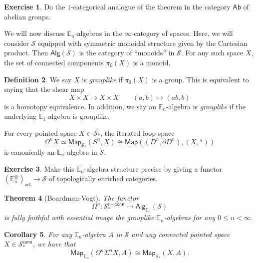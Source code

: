 \documentclass[10pt]{amsart}
\newtheorem{thm}{Theorem}[subsection]
\newtheorem{cor}[thm]{Corollary}
\theoremstyle{definition}
\newtheorem{defn}[thm]{Definition}
\newtheorem{exer}[thm]{Exercise}
\theoremstyle{remark}
\theoremstyle{plain}
\theoremstyle{definition}
\theoremstyle{remark}
\newcommand{\E}{\mathbb{E}}
\newcommand{\mc}[1]{\mathcal{#1}}
\newcommand{\ms}[1]{\mathsf{#1}}
\newcommand{\1}{\mathbf{1}}
\newcommand{\2}{\mathbf{2}}
\newcommand{\3}{\mathbf{3}}
\begin{document}
\begin{exer}
    Do the $1$-categorical analogue of the theorem in the category $\ms{Ab}$ of abelian groups.
\end{exer}

We will now discuss $\E_n$-algebras in the $\infty$-category of spaces. Here, we will consider $\mc{S}$ equipped with symmetric monoidal structure given by the Cartesian product. Then $\ms{Alg}(\mc{S})$ is the category of ``monoids'' in $\mc{S}$. For any such space $X$, the set of connected components $\pi_0(X)$ is a monoid.

\begin{defn}
    We say $X$ is \textit{grouplike} if $\pi_0 (X)$ is a group. This is equivalent to saying that the shear map
    \[ X \times X \to X \times X \qquad (a,b) \mapsto (ab, b) \]
    is a homotopy equivalence. In addition, we say an $\E_n$-algebra is \textit{grouplike} if the underlying $\E_1$-algebra is grouplike.
\end{defn}

For every pointed space $X \in \mc{S}_*$, the iterated loop space
\[ \Omega^n X \simeq \ms{Map}_{\mc{S}_*}(S^n, X) \cong \ms{Map}((D^n, \partial D^n), (X, *)) \]
is canonically an $\E_n$-algebra in $\mc{S}$.

\begin{exer}
    Make this $\E_n$-algebra structure precise by giving a functor $(\E_n^{\otimes})_{\ms{act}} \to \mc{S}$ of topologically enriched categories.
\end{exer}

\begin{thm}[Boardman-Vogt]\label{thm:enalgspaces}
    The functor 
    \[ \Omega^n \colon \mc{S}_*^{n\ms{-conn}} \to \ms{Alg}_{\E_n}(\mc{S}) \]
    is fully faithful with essential image the grouplike $\E_n$-algebras for any $0 \leq n < \infty$.
\end{thm}

\begin{cor}
    For any $\E_n$-algebra $A$ in $\mc{S}$ and any connected pointed space $X \in \mc{S}_*^{\ms{conn}}$, we have that
    \[ \ms{Map}_{\E_n}(\Omega^n \Sigma^n X, A) \cong \ms{Map}_{\mc{S}_*}(X, A). \]
\end{cor}
\end{document}
